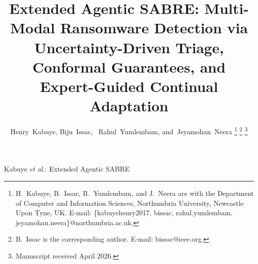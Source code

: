 \documentclass[journal]{IEEEtran}
\begin{document}
\title{Extended Agentic SABRE: Multi-Modal Ransomware Detection via
Uncertainty-Driven Triage, Conformal Guarantees, and Expert-Guided
Continual Adaptation}

\author{Henry~Kabuye,
        Biju~Issac,~
        Rahul~Yumlembam,
        and~Jeyamohan~Neera%
\thanks{H.~Kabuye, B.~Issac, R.~Yumlembam, and J.~Neera are with the
Department of Computer and Information Sciences, Northumbria University,
Newcastle Upon Tyne, UK.
E-mail: \{kabuyehenry2017, bissac, rahul.yumlembam, jeyamohan.neera\}@northumbria.ac.uk.}%
\thanks{B.~Issac is the corresponding author.
E-mail: bissac@ieee.org.}%
\thanks{Manuscript received April 2026.}}

%
{Kabuye \emph{et al.}: Extended Agentic SABRE}

\maketitle
\end{document}
